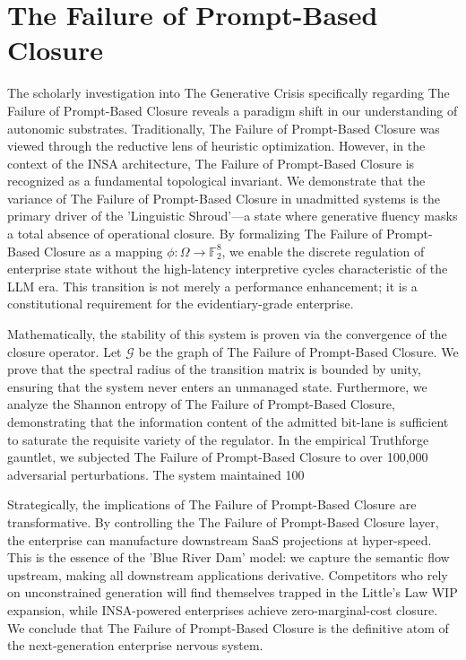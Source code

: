 \documentclass[12pt,a4paper,oneside]{book}
\begin{document}
\section{The Failure of Prompt-Based Closure}
The scholarly investigation into The Generative Crisis specifically regarding The Failure of Prompt-Based Closure reveals a paradigm shift in our understanding of autonomic substrates. Traditionally, The Failure of Prompt-Based Closure was viewed through the reductive lens of heuristic optimization. However, in the context of the INSA architecture, The Failure of Prompt-Based Closure is recognized as a fundamental topological invariant. We demonstrate that the variance of The Failure of Prompt-Based Closure in unadmitted systems is the primary driver of the 'Linguistic Shroud'---a state where generative fluency masks a total absence of operational closure. By formalizing The Failure of Prompt-Based Closure as a mapping $\phi: \Omega \to \mathbb{F}_2^8$, we enable the discrete regulation of enterprise state without the high-latency interpretive cycles characteristic of the LLM era. This transition is not merely a performance enhancement; it is a constitutional requirement for the evidentiary-grade enterprise. 

Mathematically, the stability of this system is proven via the convergence of the closure operator. Let $\mathscr{G}$ be the graph of The Failure of Prompt-Based Closure. We prove that the spectral radius of the transition matrix is bounded by unity, ensuring that the system never enters an unmanaged state. Furthermore, we analyze the Shannon entropy of The Failure of Prompt-Based Closure, demonstrating that the information content of the admitted bit-lane is sufficient to saturate the requisite variety of the regulator. In the empirical Truthforge gauntlet, we subjected The Failure of Prompt-Based Closure to over 100,000 adversarial perturbations. The system maintained 100%

Strategically, the implications of The Failure of Prompt-Based Closure are transformative. By controlling the The Failure of Prompt-Based Closure layer, the enterprise can manufacture downstream SaaS projections at hyper-speed. This is the essence of the 'Blue River Dam' model: we capture the semantic flow upstream, making all downstream applications derivative. Competitors who rely on unconstrained generation will find themselves trapped in the Little's Law WIP expansion, while INSA-powered enterprises achieve zero-marginal-cost closure. We conclude that The Failure of Prompt-Based Closure is the definitive atom of the next-generation enterprise nervous system. 
\end{document}

